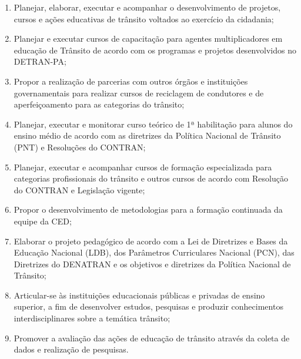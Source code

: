 \documentclass[a4paper]{article}
\begin{document}
\begin{enumerate}
\item Planejar, elaborar, executar e acompanhar o desenvolvimento de projetos, cursos e ações educativas de trânsito voltados ao exercício da cidadania;
\item Planejar e executar cursos de capacitação para agentes multiplicadores em educação de Trânsito de acordo com os programas e projetos desenvolvidos no DETRAN-PA;
\item Propor a realização de parcerias com outros órgãos e instituições governamentais para realizar cursos de reciclagem de condutores e de aperfeiçoamento para as categorias do trânsito;
\item Planejar, executar e monitorar curso teórico de 1ª habilitação para alunos do ensino médio de acordo com as diretrizes da Política Nacional de Trânsito (PNT) e Resoluções do CONTRAN;
\item Planejar, executar e acompanhar cursos de formação especializada para categorias profissionais do trânsito e outros cursos de acordo com Resolução do CONTRAN e Legislação vigente;
\item Propor o desenvolvimento de metodologias para a formação continuada da equipe da CED;
\item Elaborar o projeto pedagógico de acordo com a Lei de Diretrizes e Bases da Educação Nacional (LDB), dos Parâmetros Curriculares Nacional (PCN), das Diretrizes do DENATRAN e os objetivos e diretrizes da Política Nacional de Trânsito;
\item Articular-se às instituições educacionais públicas e privadas de ensino superior, a fim de desenvolver estudos, pesquisas e produzir conhecimentos interdisciplinares sobre a temática trânsito;
\item Promover a avaliação das ações de educação de trânsito através da coleta de dados e realização de pesquisas.
\end{enumerate}
\end{document}
